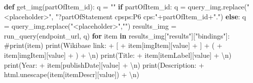 \documentclass[
  letterpaper,
]{book}
\newenvironment{Shaded}{\begin{snugshade}}{\end{snugshade}}
\newcommand{\BuiltInTok}[1]{\textcolor[rgb]{0.00,0.23,0.31}{#1}}
\newcommand{\CharTok}[1]{\textcolor[rgb]{0.13,0.47,0.30}{#1}}
\newcommand{\CommentTok}[1]{\textcolor[rgb]{0.37,0.37,0.37}{#1}}
\newcommand{\ControlFlowTok}[1]{\textcolor[rgb]{0.00,0.23,0.31}{\textbf{#1}}}
\newcommand{\KeywordTok}[1]{\textcolor[rgb]{0.00,0.23,0.31}{\textbf{#1}}}
\newcommand{\NormalTok}[1]{\textcolor[rgb]{0.00,0.23,0.31}{#1}}
\newcommand{\OperatorTok}[1]{\textcolor[rgb]{0.37,0.37,0.37}{#1}}
\newcommand{\StringTok}[1]{\textcolor[rgb]{0.13,0.47,0.30}{#1}}
\begin{document}
\begin{Shaded}
\begin{Highlighting}[]
\KeywordTok{def}\NormalTok{ get\_img(partOfItem\_id):}
\NormalTok{    q }\OperatorTok{=} \StringTok{""}
    \ControlFlowTok{if}\NormalTok{ partOfItem\_id:}
\NormalTok{        q }\OperatorTok{=}\NormalTok{ query\_img.replace(}\StringTok{"\textless{}placeholder\textgreater{}"}\NormalTok{, }\StringTok{"?partOfStatement cpsps:P6 cps:"}\OperatorTok{+}\NormalTok{partOfItem\_id}\OperatorTok{+}\StringTok{"."}\NormalTok{)}
    \ControlFlowTok{else}\NormalTok{:}
\NormalTok{        q }\OperatorTok{=}\NormalTok{ query\_img.replace(}\StringTok{"\textless{}placeholder\textgreater{}"}\NormalTok{,}\StringTok{""}\NormalTok{)}
\NormalTok{    results\_img }\OperatorTok{=}\NormalTok{ run\_query(endpoint\_url, q)}
    \ControlFlowTok{for}\NormalTok{ item }\KeywordTok{in}\NormalTok{ results\_img[}\StringTok{"results"}\NormalTok{][}\StringTok{"bindings"}\NormalTok{]:    }
      \CommentTok{\#print(item)}
      \BuiltInTok{print}\NormalTok{(}\StringTok{\textquotesingle{}Wikibase link: \textquotesingle{}} \OperatorTok{+} \StringTok{\textquotesingle{}[\textquotesingle{}} \OperatorTok{+}\NormalTok{ item[}\StringTok{\textquotesingle{}imgItem\textquotesingle{}}\NormalTok{][}\StringTok{\textquotesingle{}value\textquotesingle{}}\NormalTok{] }\OperatorTok{+} \StringTok{\textquotesingle{}]\textquotesingle{}} \OperatorTok{+} \StringTok{\textquotesingle{}(\textquotesingle{}} \OperatorTok{+}\NormalTok{ item[}\StringTok{\textquotesingle{}imgItem\textquotesingle{}}\NormalTok{][}\StringTok{\textquotesingle{}value\textquotesingle{}}\NormalTok{] }\OperatorTok{+} \StringTok{\textquotesingle{})\textquotesingle{}} \OperatorTok{+} \StringTok{\textquotesingle{}}\CharTok{\textbackslash{}n}\StringTok{\textquotesingle{}}\NormalTok{)}
      \BuiltInTok{print}\NormalTok{(}\StringTok{\textquotesingle{}Title: \textquotesingle{}} \OperatorTok{+}\NormalTok{ item[}\StringTok{\textquotesingle{}itemLabel\textquotesingle{}}\NormalTok{][}\StringTok{\textquotesingle{}value\textquotesingle{}}\NormalTok{] }\OperatorTok{+} \StringTok{\textquotesingle{}}\CharTok{\textbackslash{}n}\StringTok{\textquotesingle{}}\NormalTok{)}
      \BuiltInTok{print}\NormalTok{(}\StringTok{\textquotesingle{}Year: \textquotesingle{}} \OperatorTok{+}\NormalTok{ item[}\StringTok{\textquotesingle{}publishDate\textquotesingle{}}\NormalTok{][}\StringTok{\textquotesingle{}value\textquotesingle{}}\NormalTok{] }\OperatorTok{+} \StringTok{\textquotesingle{}}\CharTok{\textbackslash{}n}\StringTok{\textquotesingle{}}\NormalTok{)}
      \BuiltInTok{print}\NormalTok{(}\StringTok{\textquotesingle{}Description: \textquotesingle{}} \OperatorTok{+}\NormalTok{ html.unescape(item[}\StringTok{\textquotesingle{}itemDescr\textquotesingle{}}\NormalTok{][}\StringTok{\textquotesingle{}value\textquotesingle{}}\NormalTok{]) }\OperatorTok{+} \StringTok{\textquotesingle{}}\CharTok{\textbackslash{}n}\StringTok{\textquotesingle{}}\NormalTok{)}


\end{Highlighting}
\end{Shaded}
\end{document}
